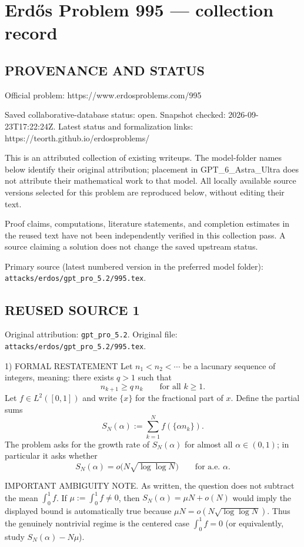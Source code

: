 \section*{Erd\H{o}s Problem 995 --- collection record}

\subsection*{PROVENANCE AND STATUS}
Official problem: https://www.erdosproblems.com/995

Saved collaborative-database status: open.
Snapshot checked: 2026-09-23T17:22:24Z.
Latest status and formalization links: https://teorth.github.io/erdosproblems/

This is an attributed collection of existing writeups. The model-folder names below identify their original attribution; placement in GPT\_6\_Astra\_Ultra does not attribute their mathematical work to that model. All locally available source versions selected for this problem are reproduced below, without editing their text.

Proof claims, computations, literature statements, and completion estimates in the reused text have not been independently verified in this collection pass. A source claiming a solution does not change the saved upstream status.

Primary source (latest numbered version in the preferred model folder): \texttt{attacks/erdos/gpt\_pro\_5.2/995.tex}.

\subsection*{REUSED SOURCE 1}
Original attribution: \texttt{gpt\_pro\_5.2}.
Original file: \texttt{attacks/erdos/gpt\_pro\_5.2/995.tex}.


1) FORMAL RESTATEMENT
Let $n_1<n_2<\cdots$ be a lacunary sequence of integers, meaning: there exists $q>1$ such that
\[
 n_{k+1}\ge q\,n_k\qquad\text{for all }k\ge 1.
\]
Let $f\in L^2([0,1])$ and write $\{x\}$ for the fractional part of $x$.
Define the partial sums
\[
 S_N(\alpha):=\sum_{k=1}^N f(\{\alpha n_k\}).
\]
The problem asks for the growth rate of $S_N(\alpha)$ for almost all $\alpha\in(0,1)$; in particular it asks whether
\[
 S_N(\alpha)=o\bigl(N\sqrt{\log\log N}\bigr)\qquad\text{for a.e. }\alpha.
\]

IMPORTANT AMBIGUITY NOTE.
As written, the question does not subtract the mean $\int_0^1 f$.  If $\mu:=\int_0^1 f\neq 0$, then $S_N(\alpha)=\mu N+o(N)$ would imply the displayed bound is automatically true because $\mu N = o(N\sqrt{\log\log N})$.  Thus the genuinely nontrivial regime is the centered case $\int_0^1 f=0$ (or equivalently, study $S_N(\alpha)-N\mu$).

